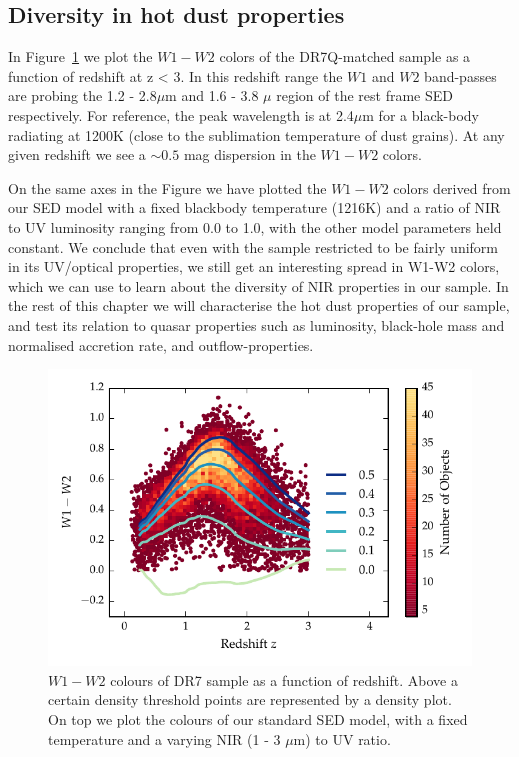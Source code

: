 \subsection{Diversity in hot dust properties}

In Figure~\ref{fig:w1w2colorsratio} we plot the $W1 - W2$ colors of the DR7Q-matched sample as a function of redshift at z < 3. 
In this redshift range the $W1$ and $W2$ band-passes are probing the 1.2 - 2.8$\mu$m and 1.6 - 3.8 $\mu$ region of the rest frame SED respectively. 
For reference, the peak wavelength is at 2.4$\mu$m for a black-body radiating at 1200K (close to the sublimation temperature of dust grains). 
At any given redshift we see a $\sim 0.5$ mag dispersion in the $W1-W2$ colors. 

On the same axes in the Figure we have plotted the $W1 - W2$ colors derived from our SED model with a fixed blackbody temperature (1216K) and a ratio of NIR to UV luminosity ranging from 0.0 to 1.0, with the other model parameters held constant. 
We conclude that even with the sample restricted to be fairly uniform in its UV/optical properties, we still get an interesting spread in W1-W2 colors, which we can use to learn about the diversity of NIR properties in our sample. 
In the rest of this chapter we will characterise the hot dust properties of our sample, and test its relation to quasar properties such as luminosity, black-hole mass and normalised accretion rate, and outflow-properties. 

\begin{figure}
\centering
\includegraphics[width=\columnwidth]{figures/chapter06/w1w2_versus_redshift_ratio.pdf}
\caption{$W1 - W2$ colours of DR7 sample as a function of redshift. Above a certain density threshold points are represented by a density plot. On top we plot the colours of our standard SED model, with a fixed temperature and a varying NIR (1 - 3 $\mu$m) to UV ratio.}
  \label{fig:w1w2colorsratio}
\end{figure}

